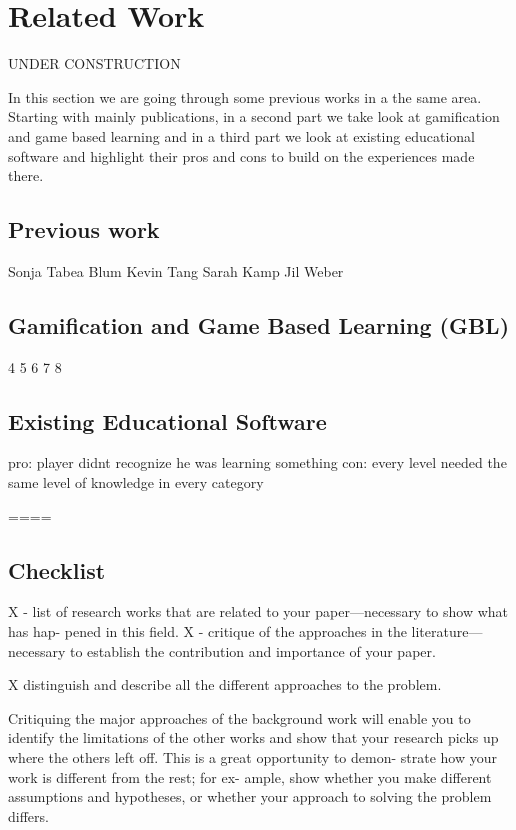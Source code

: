 
\setcounter{chapter}{1}

\chapter{Related Work}
\label{chap:relatedwork}
UNDER CONSTRUCTION

In this section we are going through some previous works in a the same area.
Starting with mainly publications, in a second part we take look at gamification
and game based learning and in a third part we look at existing educational software
and highlight their pros and cons to build on the experiences made there.

\section{Previous work}
Sonja Tabea Blum
Kevin Tang
Sarah Kamp
Jil Weber

\section{Gamification and Game Based Learning (GBL)}
4
5
6
7
8

\section{Existing Educational Software}

pro: player didnt recognize he was learning something
con: every level needed the same level of knowledge in every category

====
\section{Checklist}
X - list of research works that are related to your paper—necessary to show what has hap-
pened in this field.
X - critique of the approaches in the literature—necessary to establish the
contribution and importance of your paper.

X distinguish and describe all the different approaches to the problem.

Critiquing the major approaches of the background
work will enable you to identify the limitations of the
other works and show that your research picks up where
the others left off. This is a great opportunity to demon-
strate how your work is different from the rest; for ex-
ample, show whether you make different assumptions
and hypotheses, or whether your approach to solving the
problem differs.

